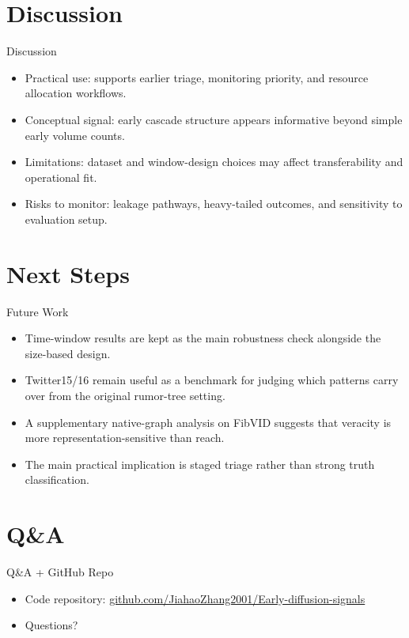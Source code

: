 \documentclass{beamer}
\begin{document}
\section{Discussion}
\begin{frame}{Discussion}
\begin{itemize}
\item Practical use: supports earlier triage, monitoring priority, and resource allocation workflows.
\item Conceptual signal: early cascade structure appears informative beyond simple early volume counts.
\item Limitations: dataset and window-design choices may affect transferability and operational fit.
\item Risks to monitor: leakage pathways, heavy-tailed outcomes, and sensitivity to evaluation setup.
\end{itemize}
\end{frame}

\section{Next Steps}
\begin{frame}{Future Work}
\begin{itemize}
\item Time-window results are kept as the main robustness check alongside the size-based design.
\item Twitter15/16 remain useful as a benchmark for judging which patterns carry over from the original rumor-tree setting.
\item A supplementary native-graph analysis on FibVID suggests that veracity is more representation-sensitive than reach.
\item The main practical implication is staged triage rather than strong truth classification.
\end{itemize}
\end{frame}

\section{Q\&A}
\begin{frame}{Q\&A + GitHub Repo}
\begin{itemize}
\item Code repository: \href{https://github.com/JiahaoZhang2001/Early-diffusion-signals.git}{github.com/JiahaoZhang2001/Early-diffusion-signals}
\item Questions?
\end{itemize}
\end{frame}
\end{document}
